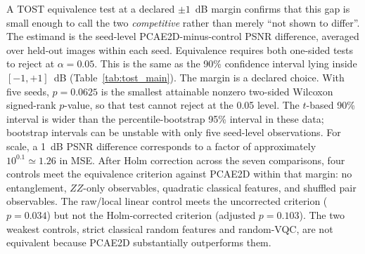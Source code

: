 \documentclass[pdflatex,sn-basic]{sn-jnl}
\begin{document}
A TOST equivalence test \citep{Schuirmann1987, Lakens2017} at a declared $\pm1$~dB margin confirms that this gap is
small enough to call the two
\emph{competitive} rather than merely ``not shown to differ''.
The estimand is the seed-level PCAE2D-minus-control PSNR difference,
averaged over held-out images within each seed. Equivalence requires both
one-sided tests to reject at $\alpha=0.05$. This is the same as the 90\%
confidence interval lying inside $[-1,+1]$~dB (Table~\ref{tab:tost_main}). The
margin is a declared choice.
With five seeds, $p=0.0625$ is the smallest attainable nonzero two-sided
Wilcoxon signed-rank $p$-value, so that test cannot reject at the 0.05 level.
The $t$-based 90\% interval is wider than the percentile-bootstrap 95\% interval
in these data; bootstrap intervals can be unstable with only five seed-level
observations. For scale, a 1~dB PSNR difference corresponds to a factor of
approximately $10^{0.1}\simeq1.26$ in MSE.
After Holm correction across the
seven comparisons, four controls meet the equivalence criterion against PCAE2D
within that margin: no entanglement, $ZZ$-only observables, quadratic classical
features, and shuffled pair observables. The raw/local linear control meets the
uncorrected criterion ($p=0.034$) but not the Holm-corrected criterion
(adjusted $p=0.103$). The two weakest controls, strict classical random
features and random-VQC, are not equivalent because PCAE2D substantially
outperforms them.
\end{document}

